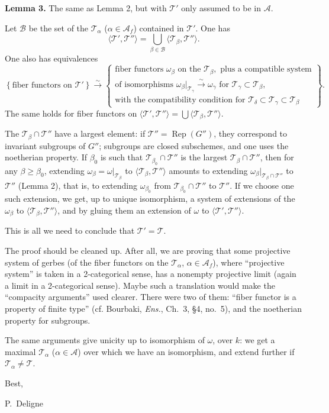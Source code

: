 \documentclass[11pt]{article}
\newcommand{\T}{\mathcal T}
\newcommand{\A}{\mathcal A}
\newcommand{\Af}{\mathcal A_f}
\newcommand{\Rep}{\operatorname{Rep}}
\begin{document}
\textbf{Lemma 3.} The same as Lemma 2, but with \(\T'\) only assumed to be in \(\A\).

Let \(\mathcal B\) be the set of the \(\T_\alpha\) (\(\alpha\in\Af\)) contained in \(\T'\). One has
\[
\langle\T',\T''\rangle=\bigcup_{\beta\in\mathcal B}\langle\T_\beta,\T''\rangle.
\]
One also has equivalences
\[
\left\{\text{fiber functors on }\T'\right\}
\xrightarrow{\sim}
\left\{
\begin{array}{c}
\text{fiber functors }\omega_\beta\text{ on the }\T_\beta,\text{ plus a compatible system}\\
\text{of isomorphisms }\omega_\beta|_{\T_\gamma}\xrightarrow{\sim}\omega_\gamma\text{ for }\T_\gamma\subset\T_\beta,\\
\text{with the compatibility condition for }\T_\delta\subset\T_\gamma\subset\T_\beta
\end{array}
\right\}.
\]
The same holds for fiber functors on \(\langle\T',\T''\rangle=\bigcup\langle\T_\beta,\T''\rangle\).

The \(\T_\beta\cap\T''\) have a largest element: if \(\T''=\Rep(G'')\), they correspond to invariant subgroups of \(G''\); subgroups are closed subschemes, and one uses the noetherian property. If \(\beta_0\) is such that \(\T_{\beta_0}\cap\T''\) is the largest \(\T_\beta\cap\T''\), then for any \(\beta\geq\beta_0\), extending \(\omega_\beta=\omega|_{\T_\beta}\) to \(\langle\T_\beta,\T''\rangle\) amounts to extending \(\omega_\beta|_{\T_\beta\cap\T''}\) to \(\T''\) (Lemma 2), that is, to extending \(\omega_{\beta_0}\) from \(\T_{\beta_0}\cap\T''\) to \(\T''\). If we choose one such extension, we get, up to unique isomorphism, a system of extensions of the \(\omega_\beta\) to \(\langle\T_\beta,\T''\rangle\), and by gluing them an extension of \(\omega\) to \(\langle\T',\T''\rangle\).

This is all we need to conclude that \(\T'=\T\).

The proof should be cleaned up. After all, we are proving that some projective system of gerbes (of the fiber functors on the \(\T_\alpha\), \(\alpha\in\Af\)), where ``projective system'' is taken in a 2-categorical sense, has a nonempty projective limit (again a limit in a 2-categorical sense). Maybe such a translation would make the ``compacity arguments'' used clearer. There were two of them: ``fiber functor is a property of finite type'' (cf. Bourbaki, \emph{Ens.}, Ch.~3, \S4, no.~5), and the noetherian property for subgroups.

The same arguments give unicity up to isomorphism of \(\omega\), over \(k\): we get a maximal \(\T_\alpha\) (\(\alpha\in\A\)) over which we have an isomorphism, and extend further if \(\T_\alpha\neq\T\).

Best,

P.~Deligne
\end{document}
